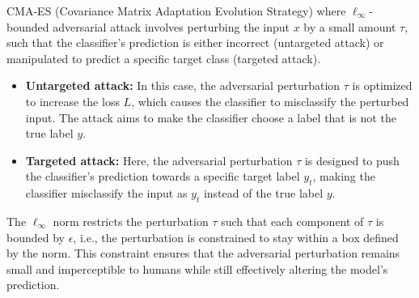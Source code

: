CMA-ES (Covariance Matrix Adaptation Evolution Strategy) where \( \ell_\infty \)-bounded adversarial attack involves perturbing the input \( x \) by a small amount \( \tau \), such that the classifier's prediction is either incorrect (untargeted attack) or manipulated to predict a specific target class (targeted attack).

\begin{itemize}
    \item \textbf{Untargeted attack:} In this case, the adversarial perturbation \( \tau \) is optimized to increase the loss \( L \), which causes the classifier to misclassify the perturbed input. The attack aims to make the classifier choose a label that is not the true label \( y \).
    \item \textbf{Targeted attack:} Here, the adversarial perturbation \( \tau \) is designed to push the classifier's prediction towards a specific target label \( y_t \), making the classifier misclassify the input as \( y_t \) instead of the true label \( y \).
\end{itemize}

The \( \ell_\infty \) norm restricts the perturbation \( \tau \) such that each component of \( \tau \) is bounded by \( \epsilon \), i.e., the perturbation is constrained to stay within a box defined by the norm. This constraint ensures that the adversarial perturbation remains small and imperceptible to humans while still effectively altering the model's prediction.

